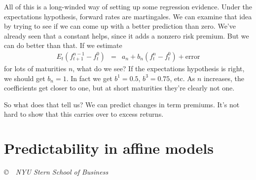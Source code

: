 \documentclass[11pt]{article}
\begin{document}
All of this is a long-winded way of setting up some  regression evidence.
Under the expectations hypothesis,
forward rates are martingales.
We can examine that idea by trying to see if we can come
up with a better prediction than zero.
We've already seen that a constant helps, since it adds a nonzero risk premium.
But we can do better than that.
If we estimate
\begin{eqnarray*}
   E_t ( f^{n-1}_{t+1} - f^{0}_{t} ) &=& a_n + b_n (f^n_t - f^0_t) + \mbox{error}
\end{eqnarray*}
for lots of maturities $n$, what do we see?
If the expectations hypothesis is right, we should get $b_n = 1$.
In fact we get $b^1 = 0.5$, $b^3 = 0.75$, etc.
As $n$ increases, the coefficients get closer to one, but at short
maturities
they're clearly not one.

So what does that tell us?  We can predict changes in term premiums.
It's not hard to show that this carries over to excess returns.


\section{Predictability in affine models}




\vfill \centerline{\it \copyright \ \number\year \
NYU Stern School of Business}
\end{document}
